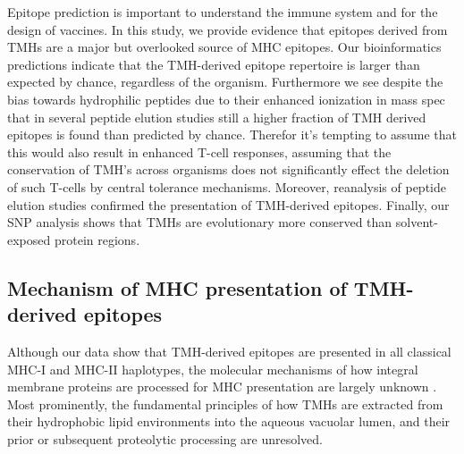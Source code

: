 Epitope prediction is important to understand the immune system 
and for the design of vaccines.
In this study, we provide evidence that epitopes
derived from TMHs are a major but overlooked source of MHC epitopes. 
Our bioinformatics predictions indicate that the TMH-derived epitope repertoire is larger than expected by chance, 
regardless of the organism. Furthermore we see despite the bias towards hydrophilic peptides due to their enhanced ionization in mass spec that in several peptide elution studies still a higher fraction of TMH derived epitopes is found than predicted by chance. Therefor it's tempting to assume that this would also result in enhanced T-cell responses, assuming that the conservation of TMH's across organisms does not significantly effect the deletion of such T-cells by central tolerance mechanisms.
Moreover, reanalysis of peptide elution studies confirmed the presentation of TMH-derived epitopes.
Finally, our SNP analysis shows that TMHs are evolutionary more conserved 
than solvent-exposed protein regions.

\subsection{Mechanism of MHC presentation of TMH-derived epitopes}

Although our data show that 
TMH-derived epitopes are presented in all classical MHC-I and MHC-II haplotypes, 
the molecular mechanisms of how integral membrane proteins are processed 
for MHC presentation are largely unknown \cite{bianchi2017}. 
Most prominently, the fundamental principles of 
how TMHs are extracted from their hydrophobic lipid environments 
into the aqueous vacuolar lumen, 
and their prior or subsequent proteolytic processing are unresolved. 

